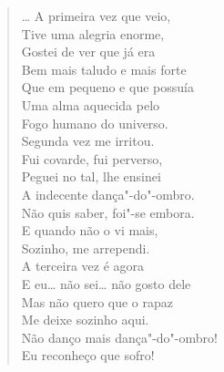 \begin{verse}
\ldots{} A primeira vez que veio,\\
Tive uma alegria enorme,\\
Gostei de ver que já era\\
Bem mais taludo e mais forte\\
Que em pequeno e que possuía\\
Uma alma aquecida pelo\\
Fogo humano do universo.\\
Segunda vez me irritou.\\
Fui covarde, fui perverso,\\
Peguei no tal, lhe ensinei\\
A indecente dança"-do"-ombro.\\
Não quis saber, foi"-se embora.\\
E quando não o vi mais,\\
Sozinho, me arrependi.\\
A terceira vez é agora\\
E eu\ldots{} não sei\ldots{} não gosto dele\\
Mas não quero que o rapaz\\
Me deixe sozinho aqui.\\
Não danço mais dança"-do"-ombro!\\
Eu reconheço que sofro!


\end{verse}
